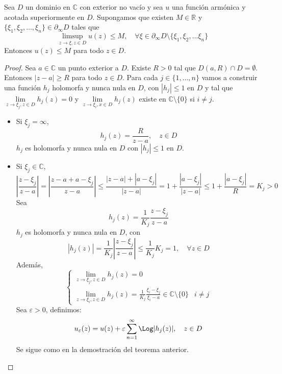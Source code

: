 \begin{theorem}
    Sea $D$ un dominio en $\mathbb{C}$ con exterior no vacío y sea $u$ una función armónica y acotada superiormente en $D$.
    Supongamos que existen $M \in \mathbb{R}$ y $\{\xi_1, \xi_2, \dots, \xi_n\} \in \partial_\infty D$ tales que
    $$\limsup_{z \to \xi, z \in D} u(z) \leq M, \quad \forall \xi \in \partial_\infty D \setminus \{\xi_1, \xi_2, \dots \xi_n\}$$
    Entonces $u(z) \leq M$ para todo $z \in D$.
\end{theorem}

\begin{proof}
    Sea $a \in \mathbb{C}$ un punto exterior a $D$.
    Existe $R > 0$ tal que $D(a, R) \cap D = \emptyset$.
    Entonces $|z-a| \geq R$ para todo $z \in D$.
    Para cada $j \in \{1, \dots, n\}$ vamos a construir una función $h_j$ holomorfa y nunca nula en $D$, con $|h_j| \leq 1$ en $D$ y tal que $\lim\limits_{z \to \xi_j, z \in D} h_j(z) = 0$ y $\lim\limits_{z \to \xi_i, x \in D} h_j(z)$ existe en $\mathbb{C} \setminus \{0\}$ si $i \neq j$.
    \begin{itemize}
        \item Si $\xi_j = \infty$,
              $$h_j(z) = \frac{R}{z-a}, \quad z \in D$$
              $h_j$ es holomorfa y nunca nula en $D$ con $|h_j| \leq 1$ en $D$.

        \item Si $\xi_j \in \mathbb{C}$,
              $$\left|\frac{z-\xi_j}{z-a}\right| = \left|\frac{z-a+a-\xi_j}{z-a}\right| \leq \frac{|z-a|+|a-\xi_j|}{|z-a|} = 1 + \frac{|a-\xi_j|}{|z-a|} \leq 1 + \frac{|a-\xi_j|}{R} = K_j > 0$$
              Sea
              $$h_j(z) = \frac{1}{K_j}\frac{z-\xi_j}{z-a}$$
              $h_j$ es holomorfa y nunca nula en $D$, con
              $$|h_j(z)| = \frac{1}{K_j}\left|\frac{z-\xi_j}{z-a}\right| \leq \frac{1}{K_j}K_j = 1, \quad \forall z \in D$$
              Además,
              $$\begin{cases}
                      \lim_{z \to \xi_j, z \in D} h_j(z) = 0                                                                                  \\
                      \lim_{z \to \xi_i, z \in D} h_j(z) = \frac{1}{K_j}\frac{\xi_i-\xi_j}{\xi_i-a} \in \mathbb{C} \setminus \{0\} & i \neq j
                  \end{cases}$$
              Sea $\varepsilon > 0$, definimos:
              $$u_\varepsilon(z) = u(z) + \varepsilon \sum_{n=1}^\infty \Log|h_j(z)|, \quad z \in D$$
              Se sigue como en la demostración del teorema anterior.
    \end{itemize}
\end{proof}

